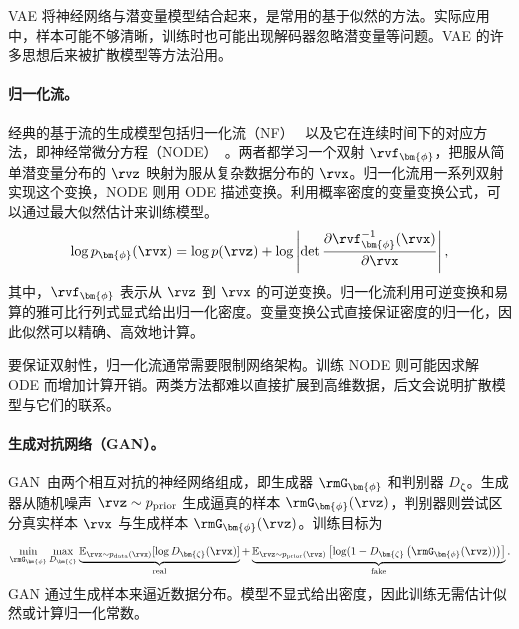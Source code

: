 VAE 将神经网络与潜变量模型结合起来，是常用的基于似然的方法。实际应用中，样本可能不够清晰，训练时也可能出现解码器忽略潜变量等问题。VAE 的许多思想后来被扩散模型等方法沿用。


\paragraph{归一化流。}
经典的基于流的生成模型包括归一化流（NF）~\citep{rezende2015variational}
以及它在连续时间下的对应方法，即神经常微分方程（NODE）~\citep{chen2018neural}。两者都学习一个双射 $\rvf_{\bm{\phi}}$，把服从简单潜变量分布的 $ \rvz $ 映射为服从复杂数据分布的 $ \rvx $。归一化流用一系列双射实现这个变换，NODE 则用 ODE 描述变换。利用概率密度的变量变换公式，可以通过最大似然估计来训练模型。
\begin{equation*}
    \log p_{\bm{\phi}}(\rvx) = \log p(\rvz) + \log \left| \det \frac{\partial \rvf_{\bm{\phi}}^{-1}(\rvx)}{\partial \rvx} \right|,
\end{equation*}
其中，$ \rvf_{\bm{\phi}} $ 表示从 $ \rvz $ 到 $ \rvx $ 的可逆变换。归一化流利用可逆变换和易算的雅可比行列式显式给出归一化密度。变量变换公式直接保证密度的归一化，因此似然可以精确、高效地计算。

要保证双射性，归一化流通常需要限制网络架构。训练 NODE 则可能因求解 ODE 而增加计算开销。两类方法都难以直接扩展到高维数据，后文会说明扩散模型与它们的联系。


\paragraph{生成对抗网络（GAN）。}
GAN~\citep{goodfellow2014generative}由两个相互对抗的神经网络组成，即生成器 $ \rmG_{\bm{\phi}} $ 和判别器 $ D_{\bm{\zeta}} $。生成器从随机噪声 $ \rvz \sim p_{\mathrm{prior}}$ 生成逼真的样本 $ \rmG_{\bm{\phi}}(\rvz) $，判别器则尝试区分真实样本 $ \rvx $ 与生成样本 $ \rmG_{\bm{\phi}}(\rvz) $。训练目标为
\begin{equation*}
    \min_{\rmG_{\bm{\phi}}} \max_{D_{\bm{\zeta}}} \underbrace{\mathbb{E}_{\rvx \sim p_{\mathrm{data}}(\rvx)}[\log D_{\bm{\zeta}}(\rvx)]}_{\text{real}} + \underbrace{\mathbb{E}_{\rvz \sim p_{\mathrm{prior}}(\rvz)}\left[\log(1 - D_{\bm{\zeta}}\left(\rmG_{\bm{\phi}}(\rvz))\right)\right]}_{\text{fake}}.
\end{equation*}
GAN 通过生成样本来逼近数据分布。模型不显式给出密度，因此训练无需估计似然或计算归一化常数。

